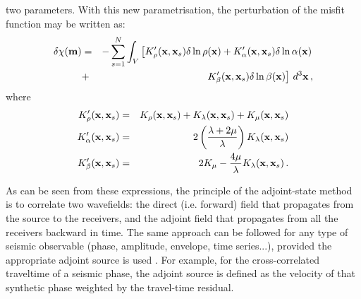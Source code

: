 two parameters. With this new parametrisation, the perturbation of the misfit function may be written as:
\begin{eqnarray}
\delta\chi(\mathbf{m}) & = & - \sum_{s=1}^N\nonumber \int_V \left[ K'_\rho(\mathbf{x},\mathbf{x}_s)\delta\ln\rho(\mathbf{x})
+K'_\alpha(\mathbf{x},\mathbf{x}_s)\delta\ln\alpha(\mathbf{x}) \right. \nonumber \\
& + & \left. K'_\beta(\mathbf{x},\mathbf{x}_s)\delta\ln\beta(\mathbf{x})\right] \, d^3\mathbf{x} \, ,
\end{eqnarray}
where
\begin{eqnarray}
K'_\rho(\mathbf{x},\mathbf{x}_s) & = &  K_\rho(\mathbf{x},\mathbf{x}_s)+K_\lambda(\mathbf{x},\mathbf{x}_s)+K_\mu(\mathbf{x},\mathbf{x}_s) \\
K'_\alpha(\mathbf{x},\mathbf{x}_s) & = &  2 \left(\frac{\lambda+2\mu}{\lambda}\right) K_\lambda(\mathbf{x},\mathbf{x}_s) \\
K'_\beta(\mathbf{x},\mathbf{x}_s) & = & 2 K_\mu -\frac{4\mu}{\lambda} K_\lambda (\mathbf{x},\mathbf{x}_s) \, .
\end{eqnarray}

As can be seen from these expressions, the principle of the adjoint-state method is to correlate two wavefields:
the direct (i.e. forward) field that propagates from the source to the receivers, and the adjoint field that propagates from all the
receivers backward in time. The same approach can be followed for any type of seismic observable (phase, amplitude,
envelope, time series...), provided the appropriate adjoint source is used \cite[]{TrTaLi05,TrKoLi08}.
For example, for the cross-correlated traveltime of a seismic
phase, the adjoint source is defined as the velocity of that synthetic phase weighted by the travel-time residual.

